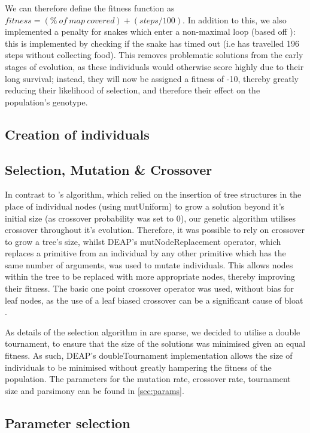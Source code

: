 \documentclass[british,10pt,a4paper]{article}
\begin{document}
We can therefore define the fitness function as \(fitness= (\% \ of\ map\ covered) + (steps/100)\). 
In addition to this, we also implemented a penalty for snakes which enter a non-maximal loop (based off \cite{Ehlis2000-sz}): this is implemented by checking if the snake has timed out (i.e has travelled 196 steps without collecting food). This removes problematic solutions from the early stages of evolution, as these individuals would otherwise score highly due to their long survival; instead, they will now be assigned a fitness of -10, thereby greatly reducing their likelihood of selection, and therefore their effect on the population's genotype.

\subsection{Creation of individuals}
\subsection{Selection, Mutation \& Crossover}
In contrast to \citeauthor{Ehlis2000-sz}'s algorithm, which relied on the insertion of tree structures in the place of individual nodes (using mutUniform)  to grow a solution beyond it's initial size (as crossover probability was set to 0), our genetic algorithm utilises crossover throughout it's evolution. Therefore, it was possible to rely on crossover to grow a tree's size, whilst DEAP's mutNodeReplacement operator, which replaces a primitive from an individual by any other primitive which has the same number of arguments, was used to mutate individuals. This allows nodes within the tree to be replaced with more appropriate nodes, thereby improving their fitness. The basic one point crossover operator was used, without bias for leaf nodes, as the use of a leaf biased crossover can be a significant cause of bloat \cite{Xie2007-zf}. 

As details of the selection algorithm in \cite{Ehlis2000-sz} are sparse, we decided to utilise a double tournament, to ensure that the size of the solutions was minimised given an equal fitness. As such, DEAP's doubleTournament implementation allows the size of individuals to be minimised without greatly hampering the fitness of the population. The parameters for the mutation rate, crossover rate, tournament size and parsimony can be found in \autoref{sec:params}.

\subsection{Parameter selection}
\label{sec:params}
\end{document}
